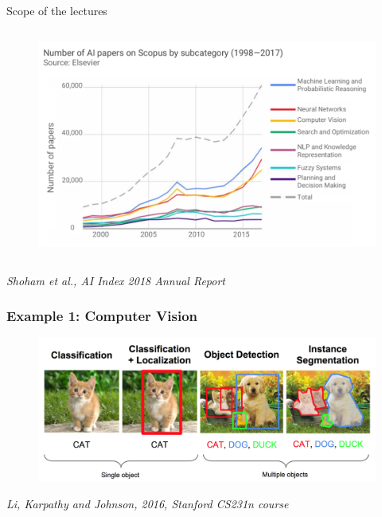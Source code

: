 \documentclass[handout]{beamer}
\newcommand{\rref}[1][]{\hfill{\scriptsize\textit{#1}}}
\begin{document}
\begin{frame}{Scope of the lectures}
\begin{columns}
\begin{figure}
\includegraphics[width=.95\textwidth]{fig/L1/progress-ml.png}
\end{figure}
  \end{columns}
  \rref[Shoham et al., AI Index 2018 Annual Report]

\end{frame}



\begin{frame}
\frametitle{Example 1: Computer Vision}
\begin{figure}
\includegraphics[width=\textwidth]{./fig/L1/compute-vision.png}
\end{figure}
\rref[Li, Karpathy and Johnson, 2016, Stanford CS231n course]

\end{frame}
\end{document}
